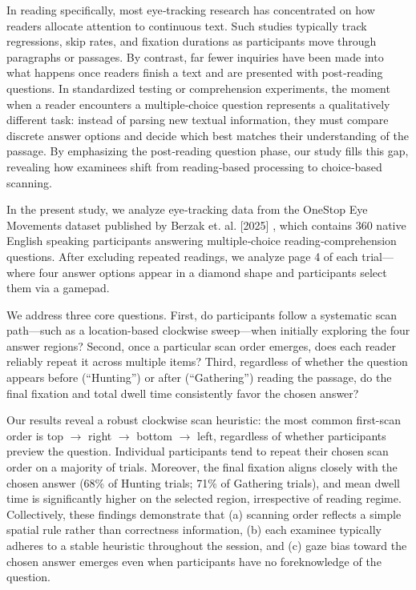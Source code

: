\documentclass[manuscript,review,anonymous]{acmart}
\begin{document}
    In reading specifically, most eye‐tracking research has concentrated on how readers allocate attention to continuous text. Such studies typically track regressions, skip rates, and fixation durations as participants move through paragraphs or passages. By contrast, far fewer inquiries have been made into what happens once readers finish a text and are presented with post‐reading questions. In standardized testing or comprehension experiments, the moment when a reader encounters a multiple‐choice question represents a qualitatively different task: instead of parsing new textual information, they must compare discrete answer options and decide which best matches their understanding of the passage. By emphasizing the post‐reading question phase, our study fills this gap, revealing how examinees shift from reading‐based processing to choice‐based scanning. 
    
    In the present study, we analyze eye‐tracking data from the OneStop Eye Movements dataset published by Berzak et. al. [2025] \cite{berzak2025onestop}, which contains 360 native English speaking participants answering multiple‐choice reading‐comprehension questions. After excluding repeated readings, we analyze page 4 of each trial—where four answer options appear in a diamond shape and participants select them via a gamepad.

    We address three core questions. First, do participants follow a systematic scan path—such as a location-based clockwise sweep—when initially exploring the four answer regions? Second, once a particular scan order emerges, does each reader reliably repeat it across multiple items? Third, regardless of whether the question appears before (“Hunting”) or after (“Gathering”) reading the passage, do the final fixation and total dwell time consistently favor the chosen answer?

    Our results reveal a robust clockwise scan heuristic: the most common first-scan order is top $\to$ right $\to$ bottom $\to$ left, regardless of whether participants preview the question. Individual participants tend to repeat their chosen scan order on a majority of trials. Moreover, the final fixation aligns closely with the chosen answer (68\% of Hunting trials; 71\% of Gathering trials), and mean dwell time is significantly higher on the selected region, irrespective of reading regime. Collectively, these findings demonstrate that (a) scanning order reflects a simple spatial rule rather than correctness information, (b) each examinee typically adheres to a stable heuristic throughout the session, and (c) gaze bias toward the chosen answer emerges even when participants have no foreknowledge of the question.
\end{document}
